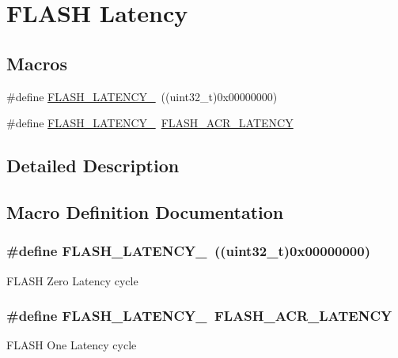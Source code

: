 \hypertarget{group___f_l_a_s_h___latency}{\section{F\-L\-A\-S\-H Latency}
\label{group___f_l_a_s_h___latency}
}
\subsection*{Macros}
\begin{DoxyCompactItemize}
\item 
\#define \hyperlink{group___f_l_a_s_h___latency_ga1276f51e97dc9857ca261fae4eb890f3}{F\-L\-A\-S\-H\-\_\-\-L\-A\-T\-E\-N\-C\-Y\-\_}~((uint32\-\_\-t)0x00000000)
\item 
\#define \hyperlink{group___f_l_a_s_h___latency_ga28c611f2cb4a3772ab37c538357fd5f6}{F\-L\-A\-S\-H\-\_\-\-L\-A\-T\-E\-N\-C\-Y\-\_}~\hyperlink{group___peripheral___registers___bits___definition_gaef5e44cbb084160a6004ca9951ec7318}{F\-L\-A\-S\-H\-\_\-\-A\-C\-R\-\_\-\-L\-A\-T\-E\-N\-C\-Y}
\end{DoxyCompactItemize}


\subsection{Detailed Description}


\subsection{Macro Definition Documentation}
\hypertarget{group___f_l_a_s_h___latency_ga1276f51e97dc9857ca261fae4eb890f3}{
\subsubsection[{F\-L\-A\-S\-H\-\_\-\-L\-A\-T\-E\-N\-C\-Y\-\_\-0}]{\setlength{\rightskip}{0pt plus 5cm}\#define F\-L\-A\-S\-H\-\_\-\-L\-A\-T\-E\-N\-C\-Y\-\_~((uint32\-\_\-t)0x00000000)}}\label{group___f_l_a_s_h___latency_ga1276f51e97dc9857ca261fae4eb890f3}
F\-L\-A\-S\-H Zero Latency cycle \hypertarget{group___f_l_a_s_h___latency_ga28c611f2cb4a3772ab37c538357fd5f6}{
\subsubsection[{F\-L\-A\-S\-H\-\_\-\-L\-A\-T\-E\-N\-C\-Y\-\_\-1}]{\setlength{\rightskip}{0pt plus 5cm}\#define F\-L\-A\-S\-H\-\_\-\-L\-A\-T\-E\-N\-C\-Y\-\_~{\bf F\-L\-A\-S\-H\-\_\-\-A\-C\-R\-\_\-\-L\-A\-T\-E\-N\-C\-Y}}}\label{group___f_l_a_s_h___latency_ga28c611f2cb4a3772ab37c538357fd5f6}
F\-L\-A\-S\-H One Latency cycle 